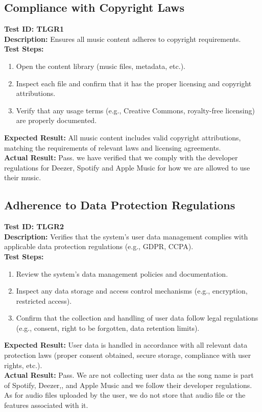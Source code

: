 \documentclass[12pt, titlepage]{article}
\begin{document}
\subsection{Compliance with Copyright Laws}
\textbf{Test ID: TLGR1}\\
\textbf{Description:} Ensures all music content adheres to copyright requirements.\\
\textbf{Test Steps:}
\begin{enumerate}
    \item Open the content library (music files, metadata, etc.).
    \item Inspect each file and confirm that it has the proper licensing and copyright attributions.
    \item Verify that any usage terms (e.g., Creative Commons, royalty-free licensing) are properly documented.
\end{enumerate}
\textbf{Expected Result:} All music content includes valid copyright attributions, matching the requirements of relevant laws and licensing agreements.\\
\textbf{Actual Result:} Pass. we have verified that we comply with the developer regulations for Deezer, Spotify and Apple Music for how we are allowed to use their music.

\subsection{Adherence to Data Protection Regulations}
\textbf{Test ID: TLGR2}\\
\textbf{Description:} Verifies that the system's user data management complies with applicable data protection regulations (e.g., GDPR, CCPA).\\
\textbf{Test Steps:}
\begin{enumerate}
    \item Review the system's data management policies and documentation.
    \item Inspect any data storage and access control mechanisms (e.g., encryption, restricted access).
    \item Confirm that the collection and handling of user data follow legal regulations (e.g., consent, right to be forgotten, data retention limits).
\end{enumerate}
\textbf{Expected Result:} User data is handled in accordance with all relevant data protection laws (proper consent obtained, secure storage, compliance with user rights, etc.).\\
\textbf{Actual Result:} Pass. We are not collecting user data as the song name is part of Spotify, Deezer,, and Apple Music and we follow their developer regulations. As for audio files uploaded by the user, we do not store that audio file or the features associated with it.
	
\end{document}
